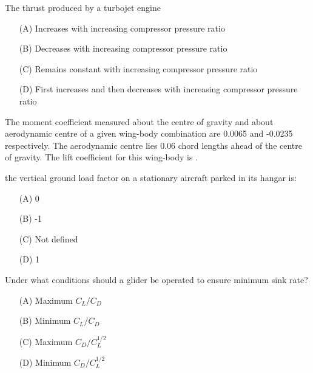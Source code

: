 \vspace{0.5cm}
\item The thrust produced by a turbojet engine
\begin{itemize}
    \item[(A)] Increases with increasing compressor pressure ratio
    \item[(B)] Decreases with increasing compressor pressure ratio
    \item[(C)] Remains constant with increasing compressor pressure ratio
    \item[(D)] First increases and then decreases with increasing compressor pressure ratio
\end{itemize}
\vspace{0.5cm}
\item The moment coefficient measured about the centre of gravity and about aerodynamic centre of a given wing-body combination are 0.0065 and -0.0235 respectively. The aerodynamic centre lies 0.06 chord lengths ahead of the centre of gravity. The lift coefficient for this wing-body is \underline{\hspace{2cm}}.
\vspace{0.5cm}

\item the vertical ground load factor on a stationary aircraft parked in its hangar is:
\begin{multicols}{2}
\begin{itemize}
    \item[(A)] 0
    \item[(B)] -1
    \item[(C)] Not defined
    \item[(D)] 1
\end{itemize}
\end{multicols}

\vspace{0.5cm}

\item Under what conditions should a glider be operated to ensure minimum sink rate?
\begin{multicols}{2}
\begin{itemize}
    \item[(A)] Maximum $C_L/C_D$
    \item[(B)] Minimum $C_L/C_D$
    \item[(C)] Maximum $C_D/C_L^{1/2}$
    \item[(D)] Minimum $C_D/C_L^{1/2}$
\end{itemize}
\end{multicols}

